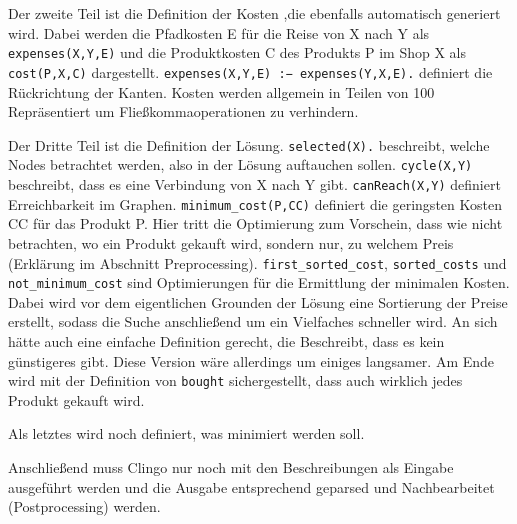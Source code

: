 Der zweite Teil ist die Definition der Kosten ,die ebenfalls automatisch generiert wird. Dabei werden die Pfadkosten E für die Reise von X nach Y als \texttt{expenses(X,Y,E)} und die Produktkosten C des Produkts P im Shop X als \texttt{cost(P,X,C)} dargestellt. \texttt{expenses(X,Y,E) :− expenses(Y,X,E).} definiert die Rückrichtung der Kanten. Kosten werden allgemein in Teilen von 100 Repräsentiert um Fließkommaoperationen zu verhindern. 



Der Dritte Teil ist die Definition der Lösung. \texttt{selected(X).} beschreibt, welche Nodes betrachtet werden, also in der Lösung auftauchen sollen. \texttt{cycle(X,Y)} beschreibt, dass es eine Verbindung von X nach Y gibt. \texttt{canReach(X,Y)} definiert Erreichbarkeit im Graphen. \texttt{minimum\_cost(P,CC)} definiert die geringsten Kosten CC für das Produkt P. Hier tritt die Optimierung zum Vorschein, dass wie nicht betrachten, wo ein Produkt gekauft wird, sondern nur, zu welchem Preis (Erklärung im Abschnitt Preprocessing). \texttt{first\_sorted\_cost}, \texttt{sorted\_costs} und \texttt{not\_minimum\_cost} sind Optimierungen für die Ermittlung der minimalen Kosten. Dabei wird vor dem eigentlichen Grounden der Lösung eine Sortierung der Preise erstellt, sodass die Suche anschließend um ein Vielfaches schneller wird. An sich hätte auch eine einfache Definition gerecht, die Beschreibt, dass es kein günstigeres gibt. Diese Version wäre allerdings um einiges langsamer. Am Ende wird mit der Definition von \texttt{bought} sichergestellt, dass auch wirklich jedes Produkt gekauft wird. 



Als letztes wird noch definiert, was minimiert werden soll.



Anschließend muss Clingo nur noch mit den Beschreibungen als Eingabe ausgeführt werden und die Ausgabe entsprechend geparsed und Nachbearbeitet (Postprocessing) werden.
